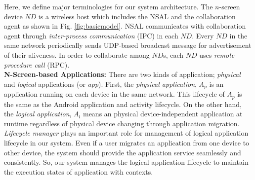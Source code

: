 \documentclass[conference]{IEEEtran}
\begin{document}

Here, we define major terminologies for our system architecture. The $n$-screen device $ND$ is a wireless host which includes the NSAL and the collaboration agent as shown in Fig. \ref{fig:basicmodel}. NSAL communicates with collaboration agent through \textit{inter-process communication} (IPC) in each $ND$.  Every $ND$ in the same network periodically sends UDP-based broadcast message for advertisement of their aliveness.
In order to collaborate among $ND$s, each $ND$ uses \textit{remote procedure call} (RPC).  
\\

\noindent
\textbf{N-Screen-based Applications: }
There are two kinds of application; \textit{physical} and \textit{logical} applications (or \textit{app}).
First, the \textit{physical application}, $A_p$ is an application running on each device in the same network.  
This lifecycle of  $A_p$ is the same as the Android application and activity lifecycle.
On the other hand, the \textit{logical application}, $A_l$ means an physical device-independent application at runtime regardless of physical device changing through application migration.
\textit{Lifecycle manager} plays an important role for management of logical application lifecycle in our system.
Even if a user migrates an application from one device to other device, 
the system should provide the application service  seamlessly and consistently. 
So, our system manages the logical application lifecycle to maintain the execution states of application with contexts.
\end{document}
